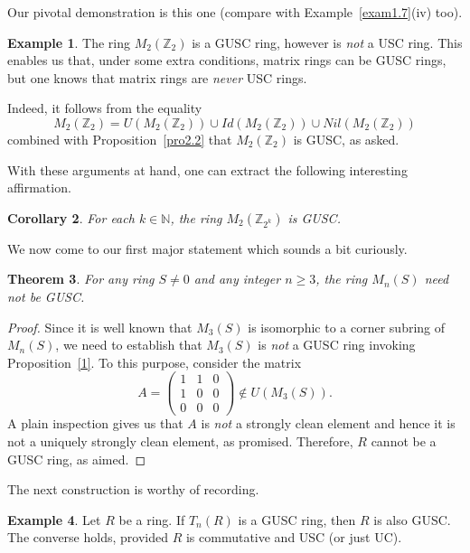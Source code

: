 \documentclass[12pt]{amsart}
\newtheorem{theorem}{Theorem}[section]
\newtheorem{corollary}[theorem]{Corollary}
\theoremstyle{definition}
\newtheorem{example}[theorem]{Example}
\begin{document}
Our pivotal demonstration is this one (compare with Example~\ref{exam1.7}(iv) too).

\begin{example}\label{exmnew}
The ring $M_2(\mathbb{Z}_2)$ is a GUSC ring, however is {\it not} a USC ring. This enables us that, under some extra conditions, matrix rings can be GUSC rings, but one knows that matrix rings are {\it never} USC rings.

Indeed, it follows from the equality $$M_2(\mathbb{Z}_2) = U(M_2(\mathbb{Z}_2)) \cup Id(M_2(\mathbb{Z}_2)) \cup Nil(M_2(\mathbb{Z}_2))$$ combined with Proposition~\ref{pro2.2} that $M_2(\mathbb{Z}_2)$ is GUSC, as asked.
\end{example}

With these arguments at hand, one can extract the following interesting affirmation.

\begin{corollary}\label{cor2.11}
For each $k \in \mathbb{N}$, the ring $M_2(\mathbb{Z}_{2^k})$ is GUSC.
\end{corollary}

We now come to our first major statement which sounds a bit curiously.

\begin{theorem}\label{3}
For any ring $S \neq 0$ and any integer $n \ge 3$, the ring $M_n(S)$ need not be GUSC.
\end{theorem}

\begin{proof}
Since it is well known that $M_3(S)$ is isomorphic to a corner subring of $M_n(S)$, we need to establish that $M_3(S)$ is {\it not} a GUSC ring invoking Proposition~\ref{1}. To this purpose, consider the matrix
$$A =\begin{pmatrix}
		1 & 1 & 0 \\
		1 & 0 & 0 \\
		0 & 0 & 0
\end{pmatrix} \notin U(M_3(S)).$$ A plain inspection gives us that $A$ is {\it not} a strongly clean element and hence it is not a uniquely strongly clean element, as promised. Therefore, $R$ cannot be a GUSC ring, as aimed.
\end{proof}

The next construction is worthy of recording.     	

\begin{example}\label{exam2.13}
Let $R$ be a ring. If $T_{n}(R)$ is a GUSC ring, then $R$ is also GUSC. The converse holds, provided $R$ is commutative and USC (or just UC).
\end{example}
\end{document}
